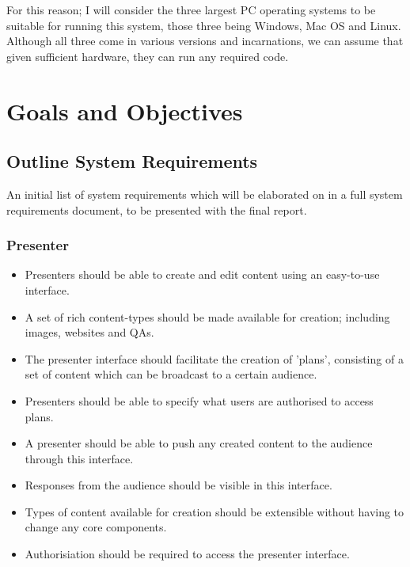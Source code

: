 \documentclass[a4papert,11pt,notitlepage]{ltxdoc}
\begin{document}
For this reason; I will consider the three largest PC operating systems to be suitable for running this system, those three being Windows, Mac OS and Linux. Although all three come in various versions and incarnations, we can assume that given sufficient hardware, they can run any required code.

\section{Goals and Objectives}
\subsection{Outline System Requirements}
An initial list of system requirements which will be elaborated on in a full system requirements document, to be presented with the final report.

\subsubsection{Presenter}
\begin{itemize}
\item Presenters should be able to create and edit content using an easy-to-use interface.
\item A set of rich content-types should be made available for creation; including images, websites and QAs.
\item The presenter interface should facilitate the creation of 'plans', consisting of a set of content which can be broadcast to a certain audience.
\item Presenters should be able to specify what users are authorised to access plans.
\item A presenter should be able to push any created content to the audience through this interface.
\item Responses from the audience should be visible in this interface.
\item Types of content available for creation should be extensible without having to change any core components.
\item Authorisiation should be required to access the presenter interface.
\end{itemize}
\end{document}
